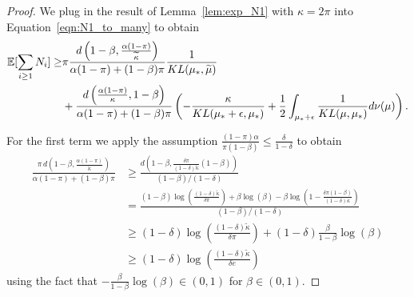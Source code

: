 \begin{proof}
We plug in the result of Lemma~\ref{lem:exp_N1} with $\kappa=2\pi$ into Equation~\ref{eqn:N1_to_many} to obtain
\begin{align*}
\mathbb{E}[ \sum_{i \geq 1} N_i ] \geq& \pi \frac{ d\left(1-\beta,  \tfrac{\alpha(1-\pi)}{\widetilde{\kappa}}\right) }{\alpha (1-\pi) + (1-\beta) \pi} \frac{1}{KL(\mu_*,\widetilde{\mu})}  \\
&+\frac{
d\left(\tfrac{\alpha(1-\pi)}{\kappa} , 1-\beta \right)}{\alpha (1-\pi) + (1-\beta) \pi} \left(  - \frac{\kappa}{KL(\mu_* + \epsilon, \mu_*)}  + \frac{1}{2} \int_{\mu_*+\epsilon} \frac{1}{KL(\mu,\mu_*)} d\nu(\mu) \right).
\end{align*}

For the first term we apply the assumption $\frac{(1-\pi)\alpha}{\pi(1-\beta)} \leq \frac{\delta}{1-\delta}$  to obtain
\begin{align*}
\frac{\pi \, d(1-\beta,  \tfrac{\alpha(1-\pi)}{\widetilde{\kappa}})}{\alpha (1-\pi) + (1-\beta) \pi} &\geq \frac{d(1-\beta, \tfrac{\delta \pi}{(1-\delta)\widetilde{\kappa}} (1-\beta))}{(1-\beta) /(1-\delta)} \\
&= \frac{(1-\beta) \log(\tfrac{(1-\delta)\widetilde{\kappa}}{\delta \pi}) + \beta \log(\beta)  - \beta \log(1-\tfrac{\delta \pi (1-\beta)}{(1-\delta)\kappa})}{(1-\beta) /(1-\delta)} \\
&\geq (1-\delta) \log(\tfrac{(1-\delta)\widetilde{\kappa}}{\delta \pi}) + (1-\delta) \tfrac{\beta}{1-\beta} \log(\beta) \\
&\geq (1-\delta) \log(\tfrac{(1-\delta)\widetilde{\kappa}}{\delta e}) 
\end{align*}
using the fact that $-\tfrac{\beta}{1-\beta} \log(\beta) \in (0,1)$ for $\beta \in (0,1)$.


\end{proof}
